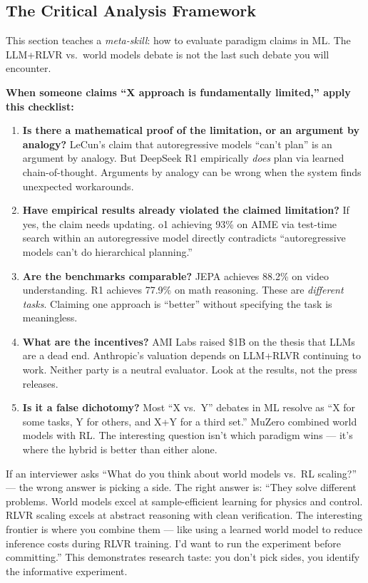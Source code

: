 \subsection*{The Critical Analysis Framework}

This section teaches a \textit{meta-skill}: how to evaluate paradigm claims in ML. The LLM+RLVR vs.\ world models debate is not the last such debate you will encounter.

\textbf{When someone claims ``X approach is fundamentally limited,'' apply this checklist:}

\begin{enumerate}
  \item \textbf{Is there a mathematical proof of the limitation, or an argument by analogy?} LeCun's claim that autoregressive models ``can't plan'' is an argument by analogy. But DeepSeek R1 empirically \textit{does} plan via learned chain-of-thought. Arguments by analogy can be wrong when the system finds unexpected workarounds.

  \item \textbf{Have empirical results already violated the claimed limitation?} If yes, the claim needs updating. o1 achieving 93\% on AIME via test-time search within an autoregressive model directly contradicts ``autoregressive models can't do hierarchical planning.''

  \item \textbf{Are the benchmarks comparable?} JEPA achieves 88.2\% on video understanding. R1 achieves 77.9\% on math reasoning. These are \textit{different tasks}. Claiming one approach is ``better'' without specifying the task is meaningless.

  \item \textbf{What are the incentives?} AMI Labs raised \$1B on the thesis that LLMs are a dead end. Anthropic's valuation depends on LLM+RLVR continuing to work. Neither party is a neutral evaluator. Look at the results, not the press releases.

  \item \textbf{Is it a false dichotomy?} Most ``X vs.\ Y'' debates in ML resolve as ``X for some tasks, Y for others, and X+Y for a third set.'' MuZero combined world models with RL. The interesting question isn't which paradigm wins --- it's where the hybrid is better than either alone.
\end{enumerate}

\begin{taste}
If an interviewer asks ``What do you think about world models vs.\ RL scaling?'' --- the wrong answer is picking a side. The right answer is: ``They solve different problems. World models excel at sample-efficient learning for physics and control. RLVR scaling excels at abstract reasoning with clean verification. The interesting frontier is where you combine them --- like using a learned world model to reduce inference costs during RLVR training. I'd want to run the experiment before committing.'' This demonstrates research taste: you don't pick sides, you identify the informative experiment.
\end{taste}

